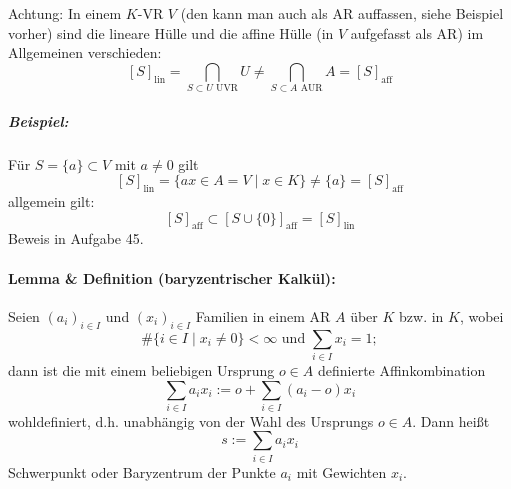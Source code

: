 	Achtung: In einem $ K $-VR $ V $ (den kann man auch als AR auffassen, siehe Beispiel vorher) sind die lineare Hülle und die affine Hülle (in $ V $ aufgefasst als AR) im Allgemeinen verschieden:
		\[ [S]_{\text{lin}} = \bigcap_{S\subset U\text{ UVR}}U \neq \bigcap_{S\subset A \text{ AUR}}A = [S]_{\text{aff}} \]
\subparagraph{Beispiel: }
	Für $ S=\{a\}\subset V $ mit $ a\neq 0 $ gilt
		\[ [S]_{\text{lin}} = \{ax\in A = V\mid x\in K\} \neq \{a\} = [S]_{\text{aff}} \]
	allgemein gilt:
		\[ [S]_{\text{aff}}\subset [S\cup \{0\}]_{\text{aff}}=[S]_{\text{lin}} \]
	Beweis in Aufgabe 45.
\paragraph{Lemma \& Definition (baryzentrischer Kalkül): }
	\begin{Definition}
		Seien $(a_i)_{i\in I}$ und $(x_i)_{i\in I}$ Familien in einem AR $ A $ über $ K $ bzw. in $ K $, wobei
		\[ \#\{i\in I\mid x_i\neq 0\}<\infty \text{ und } \sum_{i\in I}x_i=1; \]
		dann ist die mit einem beliebigen Ursprung $ o\in A $ definierte Affinkombination	
		\[ \sum_{i\in I}a_ix_i := o+\sum_{i\in I} (a_i-o)x_i \]
		wohldefiniert, d.h. unabhängig von der Wahl des Ursprungs $ o\in A $.
		Dann heißt 
		\[ s:= \sum_{i\in I} a_ix_i \]
		Schwerpunkt oder Baryzentrum der Punkte $ a_i $ mit Gewichten $ x_i $.
	\end{Definition}
